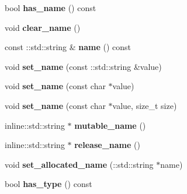 \begin{DoxyCompactItemize}
\item 
bool {\bfseries has\+\_\+name} () const \hypertarget{classCharacter_a81f2370d98998e7ad54c2df56fd2e7a1}{}\label{classCharacter_a81f2370d98998e7ad54c2df56fd2e7a1}

\item 
void {\bfseries clear\+\_\+name} ()\hypertarget{classCharacter_a0104106d7a1721d43d7e94b2e88b05a0}{}\label{classCharacter_a0104106d7a1721d43d7e94b2e88b05a0}

\item 
const \+::std\+::string \& {\bfseries name} () const \hypertarget{classCharacter_a2fb69b14ccc7b6a856f6d3a98d2b7261}{}\label{classCharacter_a2fb69b14ccc7b6a856f6d3a98d2b7261}

\item 
void {\bfseries set\+\_\+name} (const \+::std\+::string \&value)\hypertarget{classCharacter_a7d0f6be8e73483c4aac1e5a1a08b871d}{}\label{classCharacter_a7d0f6be8e73483c4aac1e5a1a08b871d}

\item 
void {\bfseries set\+\_\+name} (const char $\ast$value)\hypertarget{classCharacter_af1498f77a643ce021f654d744ef40bf6}{}\label{classCharacter_af1498f77a643ce021f654d744ef40bf6}

\item 
void {\bfseries set\+\_\+name} (const char $\ast$value, size\+\_\+t size)\hypertarget{classCharacter_acfedcef5579d06f0786b796e6c48fa1d}{}\label{classCharacter_acfedcef5579d06f0786b796e6c48fa1d}

\item 
inline\+::std\+::string $\ast$ {\bfseries mutable\+\_\+name} ()\hypertarget{classCharacter_ac829c93bde83f8f42cd1ba8d365caef3}{}\label{classCharacter_ac829c93bde83f8f42cd1ba8d365caef3}

\item 
inline\+::std\+::string $\ast$ {\bfseries release\+\_\+name} ()\hypertarget{classCharacter_a9d973d4b710de4c6ab00cb6b4c754083}{}\label{classCharacter_a9d973d4b710de4c6ab00cb6b4c754083}

\item 
void {\bfseries set\+\_\+allocated\+\_\+name} (\+::std\+::string $\ast$name)\hypertarget{classCharacter_a02ef1f00b4c9f65af29605911839db17}{}\label{classCharacter_a02ef1f00b4c9f65af29605911839db17}

\item 
bool {\bfseries has\+\_\+type} () const \hypertarget{classCharacter_a3db0a177b06c58ca40b687b1a07fc677}{}\label{classCharacter_a3db0a177b06c58ca40b687b1a07fc677}


\end{DoxyCompactItemize}
